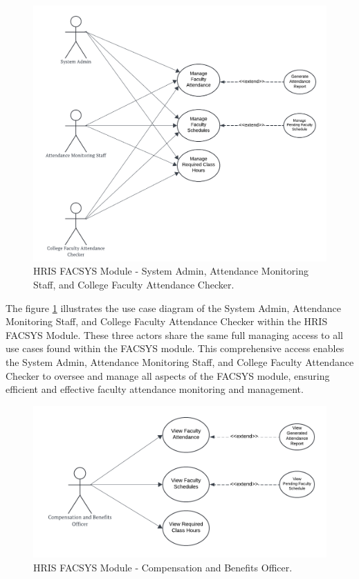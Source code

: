     \begin{figure}[H]
        \centering
        \includegraphics[width=0.9\linewidth]{figures/images/diagrams/usecase/use-case-fac-1.png}
        \caption{HRIS FACSYS Module - System Admin, Attendance Monitoring Staff, and College Faculty Attendance Checker.}
        \label{fig:use-case-fac-1}
    \end{figure}

    The figure \ref{fig:use-case-fac-1} illustrates the use case diagram of the System Admin, Attendance Monitoring Staff, and College Faculty Attendance Checker within the HRIS FACSYS Module. These three actors share the same full managing access to all use cases found within the FACSYS module. This comprehensive access enables the System Admin, Attendance Monitoring Staff, and College Faculty Attendance Checker to oversee and manage all aspects of the FACSYS module, ensuring efficient and effective faculty attendance monitoring and management.

    \begin{figure}[H]
        \centering
        \includegraphics[width=0.9\linewidth]{figures/images/diagrams/usecase/use-case-fac-2.png}
        \caption{HRIS FACSYS Module - Compensation and Benefits Officer.}
        \label{fig:use-case-fac-2}
    \end{figure}


